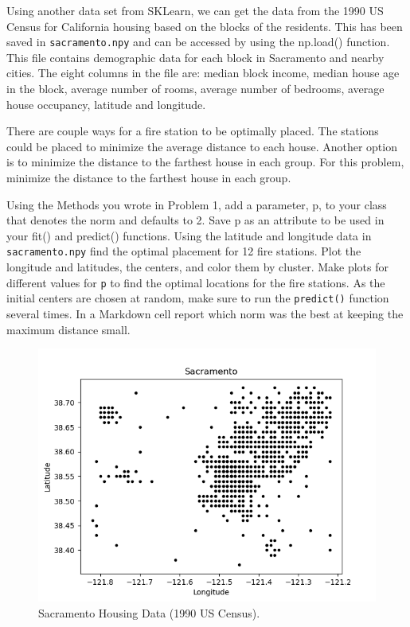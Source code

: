 Using another data set from SKLearn, we can get the data from the 1990 US Census for California housing based on the blocks of the residents.
This has been saved in \texttt{sacramento.npy} and can be accessed by using the np.load() function.
This file contains demographic data for each block in Sacramento and nearby cities. 
The eight columns in the file are: median block income, median house age in the block, average number of rooms, average number of bedrooms, average house occupancy, latitude and longitude.

There are couple ways for a fire station to be optimally placed. 
The stations could be placed to minimize the average distance to each house.
Another option is to minimize the distance to the farthest house in each group.
For this problem, minimize the distance to the farthest house in each group.

\begin{problem}
Using the Methods you wrote in Problem 1, add a parameter, p, to your class that denotes the norm and defaults to 2.
Save p as an attribute to be used in your fit() and predict() functions.
Using the latitude and longitude data in \texttt{sacramento.npy} find the optimal placement for 12 fire stations. 
Plot the longitude and latitudes, the centers, and color them by cluster.
Make plots for different values for \texttt{p} to find the optimal locations for the fire stations.
As the initial centers are chosen at random, make sure to run the \texttt{predict()} function several times.
In a Markdown cell report which norm was the best at keeping the maximum distance small.
\end{problem}
\begin{figure}[H]
	\centering
	\includegraphics[width=.7\textwidth]{figures/sacramento.png}
	\caption{Sacramento Housing Data (1990 US Census).}
	\label{fig:sacramento}
\end{figure}

